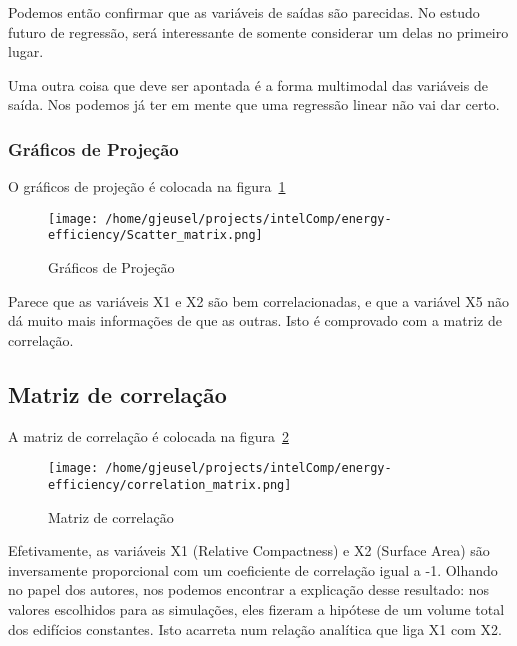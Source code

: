\documentclass[paper=a4, fontsize=11pt]{article} %
\numberwithin{equation}{section} %
\numberwithin{figure}{section} %
\numberwithin{table}{section} %
\begin{document}
Podemos então confirmar que as variáveis de saídas são parecidas.
No estudo futuro de regressão, será interessante de somente considerar um delas no primeiro lugar.

Uma outra coisa que deve ser apontada é a forma multimodal das variáveis de saída.
Nos podemos já ter em mente que uma regressão linear não vai dar certo.

\subsubsection{Gráficos de Projeção}
O gráficos de projeção é colocada na figura~\ref{scatter_matrix}

  \begin{figure}[p] %
  \begin{center}
  \texttt{[image: /home/gjeusel/projects/intelComp/energy-efficiency/Scatter\_matrix.png]}
  \end{center}
  \caption{Gráficos de Projeção}
  \label{scatter_matrix}
  \end{figure}
\restoregeometry

Parece que as variáveis X1 e X2 são bem correlacionadas, e que a variável X5 não dá muito mais informações de que as outras.
Isto é comprovado com a matriz de correlação.


\subsection{Matriz de correlação}
A matriz de correlação é colocada na figura~\ref{correlation_matrix}

  \begin{figure}[H] %
  \begin{center}
  \texttt{[image: /home/gjeusel/projects/intelComp/energy-efficiency/correlation\_matrix.png]}
  \end{center}
  \caption{Matriz de correlação}
  \label{correlation_matrix}
  \end{figure}

Efetivamente, as variáveis X1 (Relative Compactness) e X2 (Surface Area) são inversamente proporcional com um coeficiente de correlação igual a -1.
Olhando no papel dos autores, nos podemos encontrar a explicação desse resultado:
nos valores escolhidos para as simulações, eles fizeram a hipótese de um volume total dos edifícios constantes.
Isto acarreta num relação analítica que liga X1 com X2.
\end{document}
